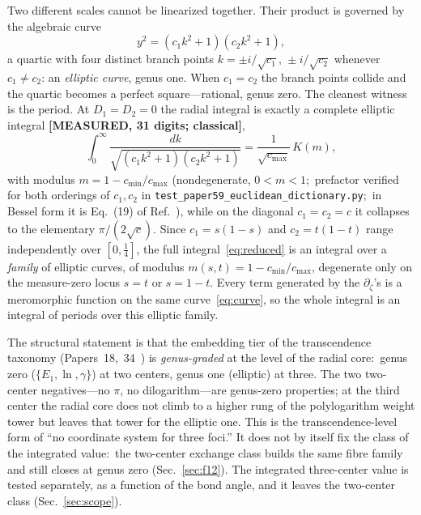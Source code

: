 \documentclass[aps,pra,twocolumn,superscriptaddress,longbibliography]{revtex4-2}
\begin{document}
Two different scales cannot be linearized together.  Their product is
governed by the algebraic curve
%
\begin{equation}
  y^{2} = (c_{1}k^{2}+1)(c_{2}k^{2}+1),
  \label{eq:curve}
\end{equation}
%
a quartic with four distinct branch points $k=\pm i/\sqrt{c_{1}},\,
\pm i/\sqrt{c_{2}}$ whenever $c_{1}\neq c_{2}$: an \emph{elliptic curve},
genus one.  When $c_{1}=c_{2}$ the branch points collide and the quartic
becomes a perfect square---rational, genus zero.  The cleanest witness is the
period.  At $D_{1}=D_{2}=0$ the radial integral is exactly a complete
elliptic integral \textbf{[MEASURED, 31 digits; classical]},
%
\begin{equation}
  \int_{0}^{\infty}\!\frac{dk}{\sqrt{(c_{1}k^{2}+1)(c_{2}k^{2}+1)}}
  = \frac{1}{\sqrt{c_{\max}}}\,K(m),
  \label{eq:period}
\end{equation}
%
with modulus $m=1-c_{\min}/c_{\max}$
(nondegenerate, $0<m<1$;\ prefactor verified for both orderings of
$c_{1},c_{2}$ in \texttt{test\_paper59\_euclidean\_dictionary.py};\ in
Bessel form it is Eq.~(19) of Ref.~\cite{bbbg2008}), while on the diagonal $c_{1}=c_{2}=c$ it collapses
to the elementary $\pi/(2\sqrt{c})$.  Since $c_{1}=s(1-s)$ and $c_{2}=t(1-t)$
range independently over $[0,\tfrac14]$, the full integral~\eqref{eq:reduced}
is an integral over a \emph{family} of elliptic curves, of modulus
$m(s,t)=1-c_{\min}/c_{\max}$, degenerate only on the measure-zero locus
$s=t$ or $s=1-t$.  Every term generated by the $\partial_{\zeta}$'s is a
meromorphic function on the same curve~\eqref{eq:curve}, so the whole integral
is an integral of periods over this elliptic family.

The structural statement is that the embedding tier of the transcendence
taxonomy (Papers~18,~34~\cite{loutey_paper18,loutey_paper34}) is \emph{genus-graded} at the
level of the radial core:\ genus zero
($\{E_{1},\ln,\gamma\}$) at two centers, genus one (elliptic) at three.
The two two-center negatives---no $\pi$, no dilogarithm---are genus-zero
properties; at the third center the radial core does not climb to a higher rung of the
polylogarithm weight tower but leaves that tower for the elliptic one.  This
is the transcendence-level form of ``no coordinate system for three foci.''
It does not by itself fix the class of the integrated value:\ the two-center
exchange class builds the same fibre family and still closes at genus zero
(Sec.~\ref{sec:f12}).  The integrated three-center value is tested separately, as a
function of the bond angle, and it leaves the two-center class (Sec.~\ref{sec:scope}).
\end{document}
